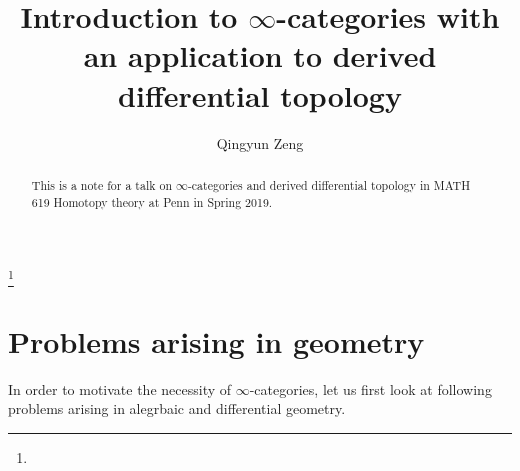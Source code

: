 \documentclass[11pt]{amsart}
\numberwithin{equation}{section}
\theoremstyle{definition}
\theoremstyle{remark}
\numberwithin{equation}{section}
\begin{document}
\title{Introduction to $\infty$-categories with  an application to derived differential topology}

\author{Qingyun Zeng}
\thanks{
}






\dedicatory{}


\begin{abstract}
This is a note for a talk on $\infty$-categories and derived differential topology in MATH 619 Homotopy theory at Penn in Spring 2019.
\end{abstract}

\maketitle
\tableofcontents




\section{Problems arising in geometry}
In order to motivate the necessity of $\infty$-categories, let us first look at following problems arising in alegrbaic and differential geometry.
\end{document}
